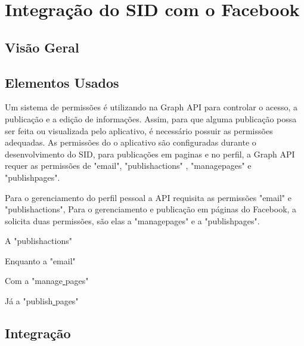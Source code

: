 \chapter[Integração do SID com o Facebook]{Integração do SID com o Facebook}
\section{Visão Geral}
\section{Elementos Usados}
Um sistema de permissões é utilizando na Graph API para controlar o acesso, a publicação e a edição de informações. Assim, para que alguma publicação possa ser feita ou visualizada pelo aplicativo, é necessário possuir as permissões adequadas. As permissões do o aplicativo são configuradas durante o desenvolvimento do SID, para publicações em paginas e no perfil, a Graph API requer as permissões de  "email", "publish\textunderscore{}actions" , "manage\textunderscore{}pages"  e "publish\textunderscore{}pages".

Para o gerenciamento do perfil pessoal a API requisita as permissões  "email" e "publish\textunderscore{}actions",  Para o gerenciamento e publicação em páginas  do Facebook, a solicita duas permissões, são elas a "manage\textunderscore{}pages" e a "publish\textunderscore{}pages".

A "publish\textunderscore{}actions"

Enquanto a "email"

Com a "manage\underline{{ }}pages"

Já a "publish\underline{{ }}pages"

\section{Integração}